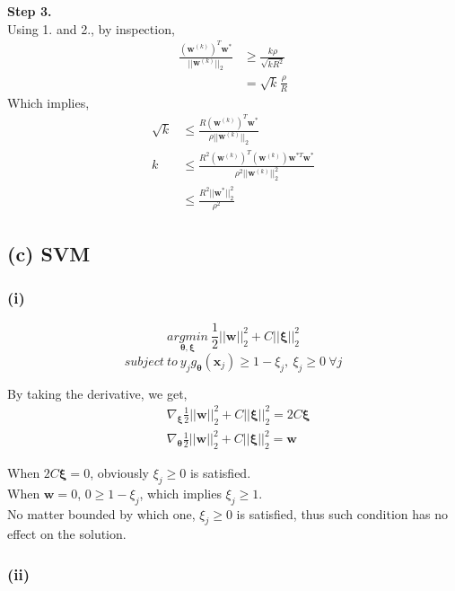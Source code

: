 \documentclass[11pt]{article}
\begin{document}
\noindent \textbf{Step 3.}\\
Using 1. and 2., by inspection,
\begin{equation}
\begin{split}
\frac{(\pmb{w}^{(k)})^T\pmb{w}^*}{||\pmb{w}^{(k)}||_2}&\ge \frac{k\rho}{\sqrt{kR^2}}\\
&= \sqrt{k}\frac{\rho}{R}
\end{split}
\end{equation}
Which implies,
\begin{equation}
\begin{split}
\sqrt{k}&\le \frac{R(\pmb{w}^{(k)})^T\pmb{w}^*}{\rho||\pmb{w}^{(k)}||_2}\\
k&\le \frac{R^2(\pmb{w}^{(k)})^T(\pmb{w}^{(k)})\pmb{w}^{*T}\pmb{w}^*}{\rho^2||\pmb{w}^{(k)}||^2_2}\\
&\le \frac{R^2||\pmb{w}^*||^2_2}{\rho^2}
\end{split}
\end{equation}

\pagebreak
\subsection*{(c) SVM}
\subsubsection*{(i)}
$$\underset{\pmb{\theta},\pmb{\xi}}{argmin}\ \frac{1}{2}||\pmb{w}||^2_2+C||\pmb{\xi}||^2_2$$
$$subject\ to\ y_jg_{\pmb{\theta}}(\pmb{x}_j)\ge 1-\xi_j,\ \xi_j\ge 0\ \forall j$$

\noindent By taking the derivative, we get,
\begin{equation}
\begin{split}
&\nabla_{\pmb{\xi}}\frac{1}{2}||\pmb{w}||^2_2+C||\pmb{\xi}||^2_2=2C\pmb{\xi}\\
&\nabla_{\pmb{\theta}}\frac{1}{2}||\pmb{w}||^2_2+C||\pmb{\xi}||^2_2=\pmb{w}
\end{split} 
\end{equation}

\noindent When $2C\pmb{\xi}=0$, obviously $\xi_j \ge 0$ is satisfied.\\
When $\pmb{w}=0$, $0\ge 1-\xi_j$, which implies $\xi_j\ge 1$.\\
No matter bounded by which one, $\xi_j \ge 0$ is satisfied, thus such condition has no effect on the solution.
\subsubsection*{(ii)}
\end{document}
